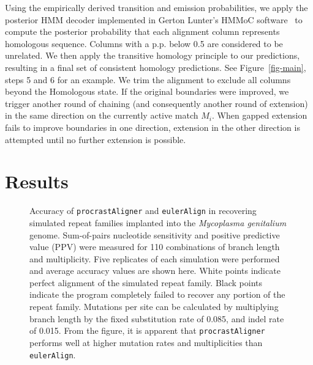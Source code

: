 \documentclass{ws-procs975x65}
\begin{document}
Using the empirically derived transition and emission probabilities, we apply the posterior HMM decoder implemented in Gerton Lunter's HMMoC software~\cite{hmmoc} to compute the posterior probability that each alignment column represents homologous sequence.  Columns with a p.p. below 0.5 are considered to be unrelated.  We then apply the transitive homology principle to our predictions, resulting in a final set of consistent homology predictions.  See Figure~\ref{fig-main}, steps 5 and 6 for an example. We trim the alignment to exclude all columns beyond the Homologous state. If the original boundaries were improved, we trigger another round of chaining (and consequently another round of extension) in the same direction on the currently active match $M_i$.  When gapped extension fails to improve boundaries in one direction, extension in the other direction is attempted until no further extension is possible.


\section{Results}
\begin{figure}[t]
\centering {}
\caption{Accuracy of \texttt{procrastAligner} and \texttt{eulerAlign} in recovering simulated repeat families implanted into the \textit{Mycoplasma genitalium} genome.  Sum-of-pairs nucleotide sensitivity and positive predictive value (PPV) were measured for 110 combinations of branch length and multiplicity.  Five replicates of each simulation were performed and
average accuracy values are shown here.  White points indicate perfect alignment of the simulated repeat family.  Black points indicate the program completely failed to recover any portion of the repeat family.  Mutations per site can be calculated by multiplying branch length by the fixed substitution rate of 0.085, and indel rate of 0.015.  From the figure, it is apparent that \texttt{procrastAligner} performs well at higher mutation rates and multiplicities than \texttt{eulerAlign}.}
\label{fig-results}\vspace{-0.2cm}
\end{figure}


%
%
\end{document}
